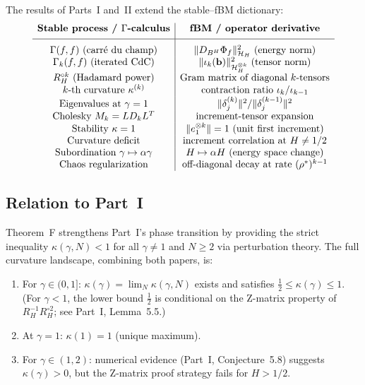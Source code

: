 \documentclass[11pt,a4paper]{article}
\theoremstyle{plain}
\theoremstyle{definition}
\theoremstyle{remark}
\newcommand{\HH}{\mathcal{H}_H}
\begin{document}
The results of Parts~I and~II extend the stable--fBM
dictionary:
\[
\begin{array}{c|c}
\textbf{Stable process / $\Gamma$-calculus}
& \textbf{fBM / operator derivative} \\[4pt]
\hline
\rule{0pt}{14pt}
\Gamma(f,f) \text{ (carr\'e du champ)}
  & \|D_{B^H}\Phi_f\|^2_{\HH}
  \text{ (energy norm)} \\
\Gamma_k(f,f) \text{ (iterated CdC)}
  & \|\iota_k(\mathbf{b})\|^2_{\HH^{\otimes k}}
  \text{ (tensor norm)} \\
R_H^{\circ k} \text{ (Hadamard power)}
  & \text{Gram matrix of diagonal } k\text{-tensors} \\
\text{$k$-th curvature } \kappa^{(k)}
  & \text{contraction ratio } \iota_k / \iota_{k-1} \\
\text{Eigenvalues at } \gamma = 1
  & \|\delta_j^{(k)}\|^2 / \|\delta_j^{(k-1)}\|^2 \\
\text{Cholesky } M_k = LD_kL^T
  & \text{increment-tensor expansion} \\
\text{Stability } \kappa = 1
  & \|e_1^{\otimes k}\| = 1 \text{ (unit first increment)} \\
\text{Curvature deficit}
  & \text{increment correlation at } H \neq 1/2 \\
\text{Subordination } \gamma \mapsto \alpha\gamma
  & H \mapsto \alpha H \text{ (energy space change)} \\
\text{Chaos regularization}
  & \text{off-diagonal decay at rate } (\rho^*)^{k-1}
\end{array}
\]


\subsection{Relation to Part~I}

Theorem~F strengthens Part~I's phase transition
by providing the strict inequality
$\kappa(\gamma,N) < 1$ for all $\gamma \neq 1$ and
$N \geq 2$ via perturbation theory.
The full curvature landscape, combining both papers, is:
\begin{enumerate}[label=(\roman*)]
\item For $\gamma \in (0,1]$:
  $\kappa(\gamma) = \lim_N \kappa(\gamma,N)$ exists and
  satisfies $\frac{1}{2} \leq \kappa(\gamma) \leq 1$.
  (For $\gamma < 1$, the lower bound $\frac{1}{2}$ is
  conditional on the Z-matrix property of
  $R_H^{-1}R_H^{\circ 2}$; see Part~I, Lemma~5.5.)
\item At $\gamma = 1$: $\kappa(1) = 1$ (unique maximum).
\item For $\gamma \in (1,2)$:
  numerical evidence (Part~I, Conjecture~5.8)
  suggests $\kappa(\gamma) > 0$, but
  the Z-matrix proof strategy fails for $H > 1/2$.
\end{enumerate}
\end{document}
